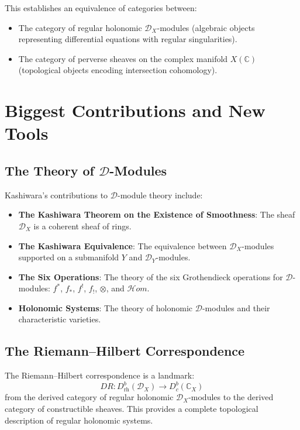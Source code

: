 This establishes an equivalence of categories between:
\begin{itemize}
\item The category of regular holonomic $\mathcal{D}_X$-modules (algebraic objects representing differential equations with regular singularities).
\item The category of perverse sheaves on the complex manifold $X(\mathbb{C})$ (topological objects encoding intersection cohomology).
\end{itemize}

\section{Biggest Contributions and New Tools}

\subsection{The Theory of $\mathcal{D}$-Modules}

Kashiwara's contributions to $\mathcal{D}$-module theory include:
\begin{itemize}
\item \textbf{The Kashiwara Theorem on the Existence of Smoothness}: The sheaf $\mathcal{D}_X$ is a coherent sheaf of rings.
\item \textbf{The Kashiwara Equivalence}: The equivalence between $\mathcal{D}_X$-modules supported on a submanifold $Y$ and $\mathcal{D}_Y$-modules.
\item \textbf{The Six Operations}: The theory of the six Grothendieck operations for $\mathcal{D}$-modules: $f^*$, $f_*$, $f^!$, $f_!$, $\otimes$, and $\mathcal{H}om$.
\item \textbf{Holonomic Systems}: The theory of holonomic $\mathcal{D}$-modules and their characteristic varieties.
\end{itemize}

\subsection{The Riemann--Hilbert Correspondence}

The Riemann--Hilbert correspondence is a landmark:
\[
DR: D^b_{\text{rh}}(\mathcal{D}_X) \to D^b_c(\mathbb{C}_X)
\]
from the derived category of regular holonomic $\mathcal{D}_X$-modules to the derived category of constructible sheaves. This provides a complete topological description of regular holonomic systems.

